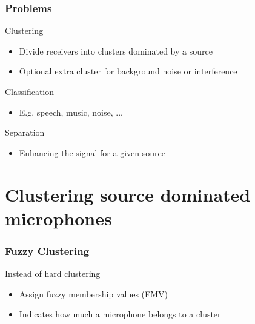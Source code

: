 \documentclass[aspectratio=169]{beamer}
\begin{document}
\begin{frame}
    \frametitle{Problems}
    Clustering
    \begin{itemize}
        \item Divide receivers into clusters dominated by a source
        \item Optional extra cluster for background noise or interference
    \end{itemize}
    \vspace{.25cm}
    Classification
    \begin{itemize}
        \item E.g. speech, music, noise, ...
    \end{itemize}
     \vspace{.25cm}
    Separation
    \begin{itemize}
        \item Enhancing the signal for a given source
    \end{itemize}
    
\end{frame}

\section{Clustering source dominated microphones}


\begin{frame}
    \frametitle{Fuzzy Clustering}
    Instead of hard clustering
     \begin{itemize}
        \item Assign fuzzy membership values (FMV)
        \item Indicates how much a microphone belongs to a cluster
           
    \end{itemize}

\end{frame}
\end{document}
